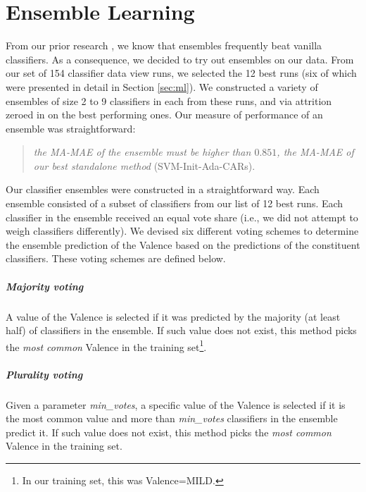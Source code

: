 \chapter{Ensemble Learning}\label{sec:ensembles}
From our prior research \cite{an2016map,kang2016ensemble}, we know that ensembles frequently beat vanilla classifiers.
As a consequence, we decided to try out ensembles on our data.
From our set of 154 classifier data view runs, we  selected the 12 best runs (six of which
were presented in detail in Section \ref{sec:ml}). We constructed
a variety of ensembles of size 2 to 9 classifiers in each 
from these runs, and via attrition zeroed in on
the best performing ones. Our measure of performance of an ensemble
was straightforward:

\begin{quote}
\textit{the \textsf{MA-MAE} of the ensemble must
be higher than $0.851$, the \textsf{MA-MAE} of our best standalone method}
(\textsf{SVM-Init-Ada-CARs}).
\end{quote} 


Our classifier ensembles were constructed in a straightforward way. Each ensemble
consisted of a subset of classifiers from our list of 12
best runs. Each classifier in the ensemble
received an equal vote share (i.e., we did not attempt to weigh
classifiers differently). We devised six different voting schemes to determine
the ensemble prediction of the \textsf{Valence} based on the predictions
of the constituent classifiers.  These voting schemes are defined below.

\paragraph{Majority voting} A value of the \textsf{Valence} is selected
if it was predicted by the majority (at least half) of classifiers in the
ensemble. If such value does not exist, this method picks the \textit{most common} \textsf{Valence} in the training set\footnote{In our training set,
this was \textsf{Valence=MILD}.}.

\paragraph{Plurality voting} Given a parameter \textit{min\_votes}, a
specific value of the \textsf{Valence} is selected if it is the most
common value and more than \textit{min\_votes} classifiers in the
ensemble predict it. If such value does not exist, 
this method picks the \textit{most common} \textsf{Valence} in the training set.

